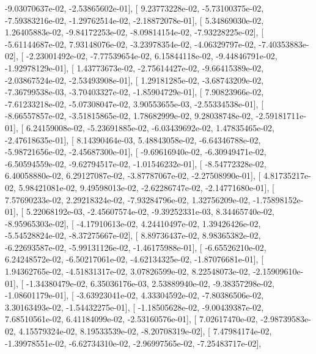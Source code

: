 \documentclass{article}
\begin{document}
         -9.03070637e-02,  -2.53865602e-01],
       [  9.23773228e-02,  -5.73100375e-02,  -7.59383216e-02,
         -1.29762514e-02,  -2.18872078e-01],
       [  5.34869030e-02,   1.26405883e-02,  -9.84172253e-02,
         -8.09814154e-02,  -7.93228225e-02],
       [ -5.61144687e-02,   7.93148076e-02,  -3.23978354e-02,
         -4.06329797e-02,  -7.40353883e-02],
       [ -2.23001492e-02,  -7.77539654e-02,   6.15844118e-02,
         -9.44846791e-02,  -1.92978129e-01],
       [  1.43773673e-02,  -2.75614427e-02,  -9.66415389e-02,
         -2.03867524e-02,  -2.53493908e-01],
       [  1.29181285e-02,  -3.68743209e-02,  -7.36799538e-03,
         -3.70403327e-02,  -1.85904729e-01],
       [  7.90823966e-02,  -7.61233218e-02,  -5.07308047e-02,
          3.90553655e-03,  -2.55334538e-01],
       [ -8.66557857e-02,  -3.51815865e-02,   1.78682999e-02,
          9.28038748e-02,  -2.59181711e-01],
       [  6.24159008e-02,  -5.23691885e-02,  -6.03439692e-02,
          1.47835465e-02,  -2.47618635e-01],
       [  8.14390464e-03,   5.48843058e-02,  -6.64346788e-02,
         -5.98721656e-02,  -2.45687300e-01],
       [ -9.69616940e-02,  -6.30949471e-02,  -6.50594559e-02,
         -9.62794517e-02,  -1.01546232e-01],
       [ -8.54772328e-02,   6.40058880e-02,   6.29127087e-02,
         -3.87787067e-02,  -2.27508990e-01],
       [  4.81735217e-02,   5.98421081e-02,   9.49598013e-02,
         -2.62286747e-02,  -2.14771680e-01],
       [  7.57690233e-02,   2.29218324e-02,  -7.93284796e-02,
          1.32756209e-02,  -1.75898152e-01],
       [  5.22068192e-03,  -2.45607574e-02,  -9.39252331e-03,
          8.34465740e-02,  -8.95965303e-02],
       [ -4.17910613e-02,   4.24410497e-02,   1.39426426e-02,
         -5.54528824e-02,  -8.37275667e-02],
       [  8.89736437e-02,   8.98365382e-02,  -6.22693587e-02,
         -5.99131126e-02,  -1.46175988e-01],
       [ -6.65526210e-02,   6.24248572e-02,  -6.50217061e-02,
         -4.62134325e-02,  -1.87076681e-01],
       [  1.94362765e-02,  -4.51831317e-02,   3.07826599e-02,
          8.22548073e-02,  -2.15909610e-01],
       [ -1.34380479e-02,   6.35036176e-03,   2.53889940e-02,
         -9.38357298e-02,  -1.08601179e-01],
       [ -3.63923041e-02,   4.33304592e-02,  -7.80386506e-02,
          3.30163493e-02,  -1.54432275e-01],
       [ -1.18505628e-02,  -9.00439387e-02,   7.68510561e-02,
          6.41184099e-02,  -2.53160576e-01],
       [  7.02617470e-02,  -2.98739583e-02,   4.15579324e-02,
          8.19533539e-02,  -8.20708319e-02],
       [  7.47984174e-02,  -1.39978551e-02,  -6.62734310e-02,
         -2.96997565e-02,  -7.25483717e-02],
\end{document}
